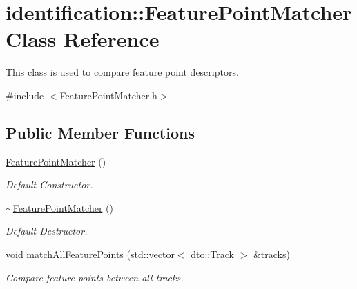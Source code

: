 \hypertarget{classidentification_1_1_feature_point_matcher}{}\section{identification\+:\+:Feature\+Point\+Matcher Class Reference}
\label{classidentification_1_1_feature_point_matcher}


This class is used to compare feature point descriptors.  




{\ttfamily \#include $<$Feature\+Point\+Matcher.\+h$>$}

\subsection*{Public Member Functions}
\begin{DoxyCompactItemize}
\item 
\mbox{\label{classidentification_1_1_feature_point_matcher_a663f3c754197b96705b0acd07d27d7e1}} 
\mbox{\hyperlink{classidentification_1_1_feature_point_matcher_a663f3c754197b96705b0acd07d27d7e1}{Feature\+Point\+Matcher}} ()
\begin{DoxyCompactList}\small\item\em Default Constructor. \end{DoxyCompactList}\item 
\mbox{\label{classidentification_1_1_feature_point_matcher_a5f82d74aab14d5871ab94290b4249195}} 
\mbox{\hyperlink{classidentification_1_1_feature_point_matcher_a5f82d74aab14d5871ab94290b4249195}{$\sim$\+Feature\+Point\+Matcher}} ()
\begin{DoxyCompactList}\small\item\em Default Destructor. \end{DoxyCompactList}\item 
\mbox{\label{classidentification_1_1_feature_point_matcher_ae482c549915e57d89bec4f6a6839caeb}} 
void \mbox{\hyperlink{classidentification_1_1_feature_point_matcher_ae482c549915e57d89bec4f6a6839caeb}{match\+All\+Feature\+Points}} (std\+::vector$<$ \mbox{\hyperlink{structdto_1_1_track}{dto\+::\+Track}} $>$ \&tracks)
\begin{DoxyCompactList}\small\item\em Compare feature points between all tracks. \end{DoxyCompactList}\end{DoxyCompactItemize}


